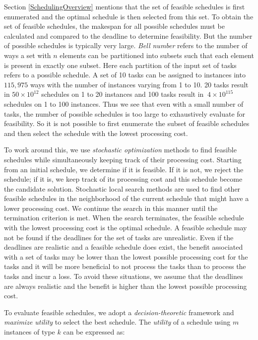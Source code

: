 \documentclass[12pt]{report}
\begin{document}
Section \ref{SchedulingOverview} mentions that the set of feasible schedules is first enumerated and the optimal schedule is then selected from this set.
To obtain the set of feasible schedules, the makespan for all possible schedules must be calculated and compared to the deadline to determine feasibility.
But the number of possible schedules is typically very large.
\textit{Bell number} \cite{mathworld:bellnumber} refers to the number of ways a set with $n$ elements can be partitioned into subsets such that each element is present in exactly one subset.
Here each partition of the input set of tasks refers to a possible schedule.
A set of 10 tasks can be assigned to instances into $115,975$ ways with the number of instances varying from 1 to 10.
20 tasks result in $50 \times 10^{12}$ schedules on 1 to 20 instances and 100 tasks result in $~ 4 \times 10^{115}$ schedules on 1 to 100 instances.
Thus we see that even with a small number of tasks, the number of possible schedules is too large to exhaustively evaluate for feasibility.
So it is not possible to first enumerate the subset of feasible schedules and then select the schedule with the lowest processing cost.

To work around this, we use \textit{stochastic optimization} methods to find feasible schedules while simultaneously keeping track of their processing cost.
Starting from an initial schedule, we determine if it is feasible.
If it is not, we reject the schedule; if it is, we keep track of its processing cost and this schedule become the candidate solution.
Stochastic local search methods are used to find other feasible schedules in the neighborhood of the current schedule that might have a lower processing cost.
We continue the search in this manner until the termination criterion is met.
When the search terminates, the feasible schedule with the lowest processing cost is the optimal schedule.
A feasible schedule may not be found if the deadlines for the set of tasks are unrealistic.
Even if the deadlines are realistic and a feasible schedule does exist, the benefit associated with a set of tasks may be lower than the lowest possible processing cost for the tasks and it will be more beneficial to not process the tasks than to process the tasks and incur a loss.
To avoid these situations, we assume that the deadlines are always realistic and the benefit is higher than the lowest possible processing cost.

To evaluate feasible schedules, we adopt a \textit{decision-theoretic} framework and \textit{maximize utility} \cite{BernadoSmith} to select the best schedule.
The \textit{utility} of a schedule using $m$ instances of type $k$ can be expressed as:
\end{document}
